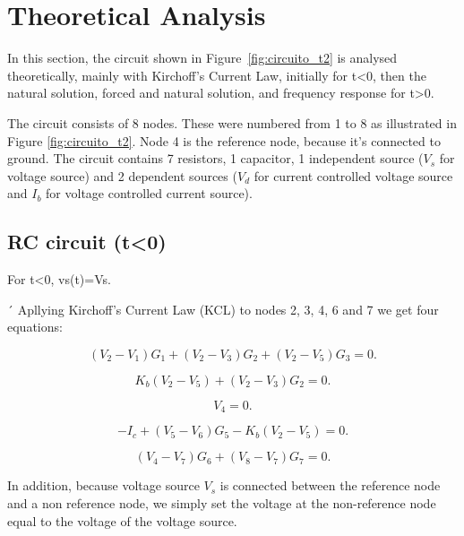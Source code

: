 \section{Theoretical Analysis}
\label{sec:analysis}

In this section, the circuit shown in Figure~\ref{fig:circuito_t2} is analysed
theoretically, mainly with Kirchoff's Current Law, initially for t<0, then the natural solution, forced and natural solution, and frequency response for t>0.

The circuit consists of 8 nodes. These were numbered from 1 to 8 as illustrated in Figure \ref{fig:circuito_t2}. Node 4 is the reference node, because it's connected to ground. The circuit contains 7 resistors, 1 capacitor, 1 independent source ($V_s$ for voltage source) and 2 dependent sources ($V_d$ for current controlled voltage source and $I_b$ for voltage controlled current source).


\subsection{RC circuit (t<0)}

For t<0, vs(t)=Vs.

´
Apllying Kirchoff's Current Law (KCL) to nodes 2, 3, 4, 6 and 7 we get four equations:

\begin{equation}
  (V_2-V_1)G_1+(V_2-V_3)G_2+(V_2-V_5)G_3=0.
  \label{eq:n2}
\end{equation}

\begin{equation}
  K_b(V_2-V_5)+(V_2-V_3)G_2=0.
  \label{eq:n3}
\end{equation}

\begin{equation}
  V_4=0.
  \label{eq:n4}
\end{equation}

\begin{equation}
  -I_c+(V_5-V_6)G_5-K_b(V_2-V_5)=0.
  \label{eq:n6}
\end{equation}

\begin{equation}
  (V_4-V_7)G_6+(V_8-V_7)G_7=0.
  \label{eq:n7}
\end{equation}

In addition, because voltage source $V_s$ is connected between the reference node and a non reference node, we simply set the voltage at the non-reference node equal to the voltage of the voltage source.

